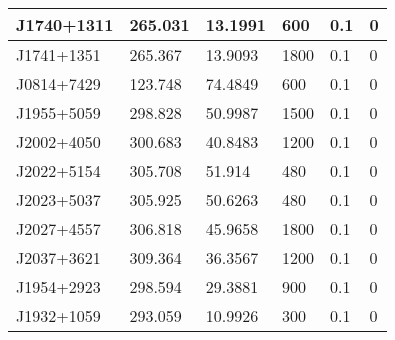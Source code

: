 \begin{table}
\begin{tabular}{|l|l|l|l|l|l|}
J1740+1311 & 265.031 & 13.1991 & 600 & 0.1 & 0 \\ \hline
J1741+1351 & 265.367 & 13.9093 & 1800 & 0.1 & 0 \\ \hline
J0814+7429 & 123.748 & 74.4849 & 600 & 0.1 & 0 \\ \hline
J1955+5059 & 298.828 & 50.9987 & 1500 & 0.1 & 0 \\ \hline
J2002+4050 & 300.683 & 40.8483 & 1200 & 0.1 & 0 \\ \hline
J2022+5154 & 305.708 & 51.914 & 480 & 0.1 & 0 \\ \hline
J2023+5037 & 305.925 & 50.6263 & 480 & 0.1 & 0 \\ \hline
J2027+4557 & 306.818 & 45.9658 & 1800 & 0.1 & 0 \\ \hline
J2037+3621 & 309.364 & 36.3567 & 1200 & 0.1 & 0 \\ \hline
J1954+2923 & 298.594 & 29.3881 & 900 & 0.1 & 0 \\ \hline
J1932+1059 & 293.059 & 10.9926 & 300 & 0.1 & 0 \\ \hline
\end{tabular}
\end{table}
